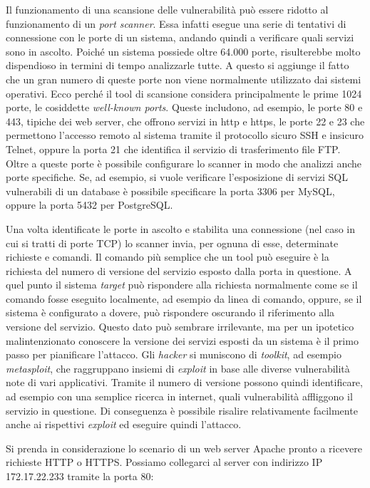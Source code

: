 \documentclass[target=mst,aauheader=]{thud}
\begin{document}
Il funzionamento di una scansione delle vulnerabilità può essere ridotto al funzionamento di un \textit{port scanner}. Essa infatti esegue una serie di tentativi di connessione con le porte di un sistema, andando quindi a verificare quali servizi sono in ascolto. Poiché un sistema possiede oltre 64.000 porte, risulterebbe molto dispendioso in termini di tempo analizzarle tutte. A questo si aggiunge il fatto che un gran numero di queste porte non viene normalmente utilizzato dai sistemi operativi. Ecco perché il tool di scansione considera principalmente le prime 1024 porte, le cosiddette \textit{well-known ports}. Queste includono, ad esempio, le porte 80 e 443, tipiche dei web server, che offrono servizi in http e https, le porte 22 e 23 che permettono l’accesso remoto al sistema tramite il protocollo sicuro SSH e insicuro Telnet, oppure la porta 21 che identifica il servizio di trasferimento file FTP. Oltre a queste porte è possibile configurare lo scanner in modo che analizzi anche porte specifiche. Se, ad esempio, si vuole verificare l’esposizione di servizi SQL vulnerabili di un database è possibile specificare la porta 3306 per MySQL, oppure la porta 5432 per PostgreSQL.

Una volta identificate le porte in ascolto e stabilita una connessione (nel caso in cui si tratti di porte TCP) lo scanner invia, per ognuna di esse, determinate richieste e comandi. Il comando più semplice che un tool può eseguire è la richiesta del numero di versione del servizio esposto dalla porta in questione. A quel punto il sistema \textit{target} può rispondere alla richiesta normalmente come se il comando fosse eseguito localmente, ad esempio da linea di comando, oppure, se il sistema è configurato a dovere, può rispondere oscurando il riferimento alla versione del servizio. Questo dato può sembrare irrilevante, ma per un ipotetico malintenzionato conoscere la versione dei servizi esposti da un sistema è il primo passo per pianificare l’attacco. Gli \textit{hacker} si muniscono di \textit{toolkit}, ad esempio \textit{metasploit}, che raggruppano insiemi di \textit{exploit} in base alle diverse vulnerabilità note di vari applicativi. Tramite il numero di versione possono quindi identificare, ad esempio con una semplice ricerca in internet, quali vulnerabilità affliggono il servizio in questione. Di conseguenza è possibile risalire relativamente facilmente anche ai rispettivi \textit{exploit} ed eseguire quindi l’attacco.

Si prenda in considerazione lo scenario di un web server Apache pronto a ricevere richieste HTTP o HTTPS. Possiamo collegarci al server con indirizzo IP 172.17.22.233 tramite la porta 80:
\end{document}
